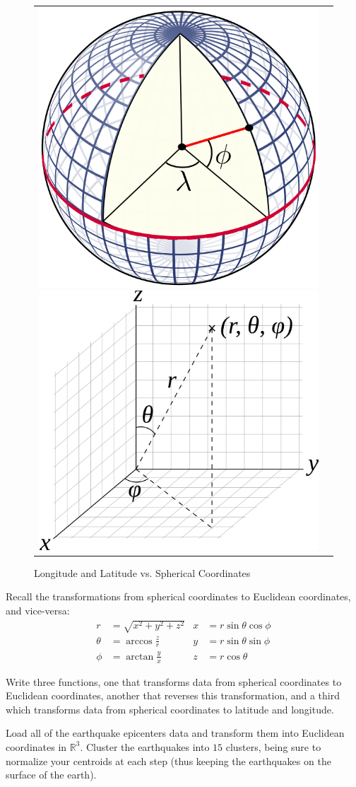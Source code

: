 \begin{figure}[h]
\centering
	\begin{tabular}{cc}
		\includegraphics[width=.49\textwidth]{latlong.png}
		\includegraphics[width=.49\textwidth]{spherical.png}
	\end{tabular}
	\caption{Longitude and Latitude vs. Spherical Coordinates}
\end{figure}

Recall the transformations from spherical coordinates to Euclidean coordinates, and vice-versa:
\begin{align*}
r & = \sqrt{x^{2} + y^{2} + z^{2}} & x & = r \sin \theta \cos \phi \\
\theta & = \arccos \frac{z}{r} & y & = r \sin \theta \sin \phi \\
\phi & = \arctan \frac{y}{x} & z & = r \cos \theta
\end{align*}

\begin{problem}
Write three functions, one that transforms data from spherical coordinates to Euclidean coordinates, another that reverses this transformation, and a third which transforms data from spherical coordinates to latitude and longitude.
\end{problem}

\begin{problem}
Load all of the earthquake epicenters data and transform them into Euclidean coordinates in $\mathbb{R}^{3}$. Cluster the earthquakes into $15$ clusters, being sure to normalize your centroids at each step (thus keeping the earthquakes on the surface of the earth).
\end{problem}

